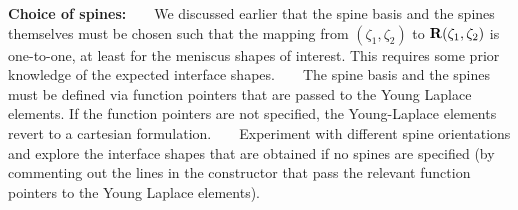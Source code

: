 \begin{DoxyEnumerate}
\item {\bfseries Choice of spines\+:} ~\newline
~\newline
 We discussed earlier that the spine basis and the spines themselves must be chosen such that the mapping from $(\zeta_1,\zeta_2)$ to ${\bf R}(\zeta_1,\zeta_2)$ is one-\/to-\/one, at least for the meniscus shapes of interest. This requires some prior knowledge of the expected interface shapes. ~\newline
 ~\newline
 The spine basis and the spines must be defined via function pointers that are passed to the Young Laplace elements. If the function pointers are not specified, the Young-\/\+Laplace elements revert to a cartesian formulation. ~\newline
~\newline
 Experiment with different spine orientations and explore the interface shapes that are obtained if no spines are specified (by commenting out the lines in the constructor that pass the relevant function pointers to the Young Laplace elements). ~\newline
~\newline


\end{DoxyEnumerate}
